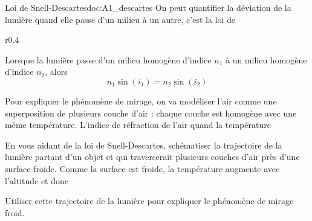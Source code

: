 \begin{doc}{Loi de Snell-Descartes}{doc:A1_descartes}
  On peut quantifier la déviation de la lumière quand elle passe d'un milieu à un autre, c'est la loi de 

  \vspace*{-16pt}
  \begin{wrapfigure}{r}{0.4\linewidth}
    \centering
  \end{wrapfigure}
  \phantom{b}
  \begin{importants}
    Lorsque la lumière passe d'un milieu homogène d'indice $n_1$ à un milieu homogène d'indice $n_2$, alors
    \begin{equation*}
      n_1 \sin(i_1) = n_2 \sin(i_2)
    \end{equation*}
  \end{importants}
  \phantom{b}
\end{doc}

\mesure
Pour expliquer le phénomène de mirage, on va modéliser l'air comme une superposition de plusieurs couche d'air : chaque couche est homogène avec une même température.
L'indice de réfraction de l'air  quand la température 

En vous aidant de la loi de Snell-Descartes, schématiser la trajectoire de la lumière partant d'un objet et qui traverserait plusieurs couches d'air près d'une surface froide.
Comme la surface est froide, la température augmente avec l'altitude et donc 

\mesure 
Utiliser cette trajectoire de la lumière pour expliquer le phénomène de mirage froid.